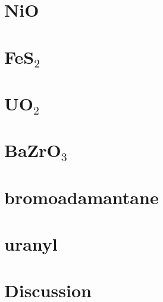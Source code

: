 \documentclass{article}
\begin{document}
\small

\normalsize

\section{NiO}

\small

\normalsize

\section{FeS$_2$}

\small

\normalsize

\section{UO$_2$}

\scriptsize

\normalsize

\section{BaZrO$_3$}

\scriptsize

\normalsize

\section{bromoadamantane}

\small

\normalsize

\section{uranyl}

\small

\normalsize

\section{Discussion}
\end{document}
